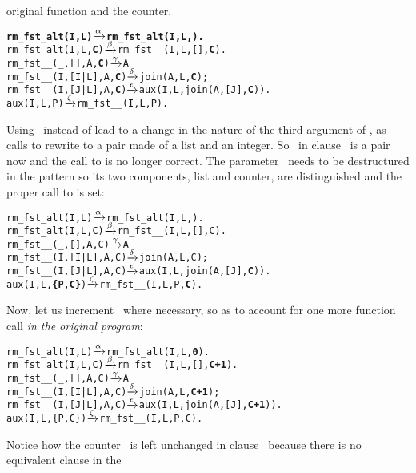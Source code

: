 original function and the counter.
\begin{alltt}
\textbf{rm_fst_alt(I,L)       \(\smashedrightarrow{\alpha}\) rm_fst_alt(I,L,).}
rm_fst_alt(I,L,\textbf{C})     \(\smashedrightarrow{\beta}\) rm_fst__(I,L,[],\textbf{C}).
rm_fst__(_,   [],A,\textbf{C}) \(\smashedrightarrow{\gamma}\) A\hfill% C \emph{unused yet}
rm_fst__(I,[I|L],A,\textbf{C}) \(\smashedrightarrow{\delta}\) join(A,L,\textbf{C});
rm_fst__(I,[J|L],A,\textbf{C}) \(\smashedrightarrow{\epsilon}\) aux(I,L,join(A,[J],\textbf{C})).
aux(I,L,P)            \(\smashedrightarrow{\zeta}\) rm_fst__(I,L,P).\hfill% \emph{Type error}
\end{alltt}
Using~ instead of  lead to a change in
the nature of the third argument of , as calls to
 rewrite to a pair made of a list and an integer. So
~in clause~\clause{\zeta} is a pair now and the call to
 is no longer correct. The
parameter~ needs to be de\-structured in the pattern so its
two components, list and counter, are distinguished and the proper
call to  is set:
\begin{alltt}
rm_fst_alt(I,L)       \(\smashedrightarrow{\alpha}\) rm_fst_alt(I,L,).
rm_fst_alt(I,L,C)     \(\smashedrightarrow{\beta}\) rm_fst__(I,L,[],C).
rm_fst__(_,   [],A,C) \(\smashedrightarrow{\gamma}\) A\hfill% C \emph{unused yet}
rm_fst__(I,[I|L],A,C) \(\smashedrightarrow{\delta}\) join(A,L,C);
rm_fst__(I,[J|L],A,C) \(\smashedrightarrow{\epsilon}\) aux(I,L,join(A,[J],\textbf{C})).
aux(I,L,\textbf{\{P,C\}})        \(\smashedrightarrow{\zeta}\) rm_fst__(I,L,P,\textbf{C}).
\end{alltt}
Now, let us increment~ where necessary, so as to account
for one more function call \emph{in the original program}:
\begin{alltt}
rm_fst_alt(I,L)       \(\smashedrightarrow{\alpha}\) rm_fst_alt(I,L,\textbf{0}).
rm_fst_alt(I,L,C)     \(\smashedrightarrow{\beta}\) rm_fst__(I,L,[],\textbf{C+1}).
rm_fst__(_,   [],A,C) \(\smashedrightarrow{\gamma}\) A\hfill% C \emph{unused yet}
rm_fst__(I,[I|L],A,C) \(\smashedrightarrow{\delta}\) join(A,L,\textbf{C+1});
rm_fst__(I,[J|L],A,C) \(\smashedrightarrow{\epsilon}\) aux(I,L,join(A,[J],\textbf{C+1})).
aux(I,L,\{P,C\})        \(\smashedrightarrow{\zeta}\) rm_fst__(I,L,P,C).
\end{alltt}
Notice how the counter~ is left unchanged in
clause~\clause{\zeta} because there is no equivalent clause in the
